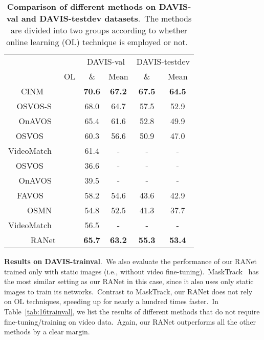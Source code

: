 \documentclass[10pt,twocolumn,letterpaper]{article}
\newcommand{\cmark}{\ding{51}}\newcommand{\xmark}{\ding{55}}\usepackage{booktabs}
\begin{document}
\begin{table}[t]
\vspace{-2mm}
\centering
\scriptsize
\begin{tabular}{r||c|cc|cc}
\Xhline{1pt}
\rowcolor[rgb]{ .873,  .91,  0.95}
&
& 
\multicolumn{2}{c|}{DAVIS-val} 
& 
\multicolumn{2}{c}{DAVIS-testdev} 
\\
\rowcolor[rgb]{ .873,  .91,  0.95}
\multicolumn{1}{c||}{\multirow{-2}{*}{Method}}
& 
\multirow{-2}{*}{OL}
& \&  &  Mean  & \&  &  Mean
\\
\hline
\hline
CINM\ \ ~\cite{cinm} & \cmark &
\textbf{70.6} & \textbf{67.2} & \textbf{67.5} & \textbf{64.5} 
\\
\rowcolor[rgb]{ .94,  .94,  .94}
OSVOS-S~\cite{osvos-s} & \cmark &
68.0 & 64.7 & 57.5 & 52.9 
\\
OnAVOS~\cite{onavos} & \cmark & 
65.4 & 61.6 & 52.8 & 49.9 
\\
\rowcolor[rgb]{ .94,  .94,  .94}
OSVOS\ \ ~\cite{osvos} & \cmark & 
60.3 & 56.6 & 50.9 & 47.0 
\\
VideoMatch~\cite{videomatch} & \cmark & 
61.4 & -    & -    & - 
\\
\hline
\hline
\rowcolor[rgb]{ .94,  .94,  .94}
OSVOS\ \ ~\cite{osvos} & \xmark & 
36.6 & -    & -    & - 
\\
OnAVOS~\cite{onavos} & \xmark & 
39.5 & -    & -    & - 
\\
\rowcolor[rgb]{ .94,  .94,  .94}
FAVOS\ \ ~\cite{favos} & \xmark & 
58.2 & 54.6 & 43.6 & 42.9 
\\
OSMN~\cite{osvos-s} & \xmark & 
54.8 & 52.5 & 41.3 & 37.7 \\
\rowcolor[rgb]{ .94,  .94,  .94}
VideoMatch~\cite{videomatch} & \xmark & 
56.5 & -    & -    & - 
\\
\hline
RANet & \xmark &
\textbf{65.7} & \textbf{63.2} & \textbf{55.3} & \textbf{53.4}
\\
\hline
\end{tabular}\vspace{-3mm}
\caption{\textbf{Comparison of different methods on DAVIS-val and DAVIS-testdev datasets}.\ The methods are divided into two groups according to whether online learning (OL) technique is employed or not.\ }
\label{tab:17val}\vspace{-4mm}
\end{table}




\noindent
\textbf{Results on DAVIS-trainval}.\
We also evaluate the performance of our RANet trained only with static images (i.e., without video fine-tuning).\ MaskTrack~\cite{masktrack} has the most similar setting as our RANet in this case, since it also uses only static images to train its networks.\ Contrast to MaskTrack, our RANet does not rely on OL techniques, speeding up for nearly a hundred times faster.\ In Table~\ref{tab:16trainval}, we list the results of different methods that do not require fine-tuning/training on video data.\ Again, our RANet outperforms all the other methods by a clear margin.
\end{document}
